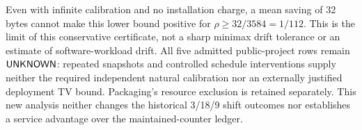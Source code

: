 Even with infinite calibration and no installation charge, a mean saving
of 32 bytes cannot make this lower bound positive for
$\rho\ge32/3584=1/112$. This is the limit of this conservative certificate,
not a sharp minimax drift tolerance or an estimate of software-workload drift.
All five admitted public-project rows remain $\mathsf{UNKNOWN}$: repeated
snapshots and controlled schedule interventions supply neither the required
independent natural calibration nor an externally justified deployment TV
bound. Packaging's resource exclusion is retained separately. This new
analysis neither changes the historical 3/18/9 shift outcomes nor establishes
a service advantage over the maintained-counter ledger.
